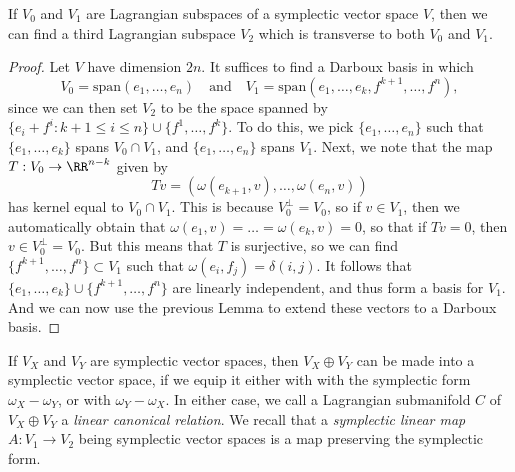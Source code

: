\begin{lemma}
    If $V_0$ and $V_1$ are Lagrangian subspaces of a symplectic vector space $V$, then we can find a third Lagrangian subspace $V_2$ which is transverse to both $V_0$ and $V_1$.
\end{lemma}
\begin{proof}
    Let $V$ have dimension $2n$. It suffices to find a Darboux basis in which
    \[ V_0 = \text{span}(e_1,\dots,e_n) \quad\text{and}\quad V_1 = \text{span}(e_1,\dots,e_k,f^{k+1},\dots,f^n), \]
    since we can then set $V_2$ to be the space spanned by $\{ e_i + f^i : k+1 \leq i \leq n \} \cup \{ f^1, \dots, f^k \}$. To do this, we pick $\{  e_1, \dots, e_n \}$ such that $\{ e_1, \dots, e_k \}$ spans $V_0 \cap V_1$, and $\{ e_1,\dots, e_n \}$ spans $V_1$. Next, we note that the map $T: V_0 \to \RR^{n-k}$ given by
    \[ Tv = (\omega(e_{k+1},v), \dots, \omega(e_n,v)) \]
    has kernel equal to $V_0 \cap V_1$. This is because $V_0^\perp = V_0$, so if $v \in V_1$, then we automatically obtain that $\omega(e_1,v) = \dots = \omega(e_k,v) = 0$, so that if $Tv = 0$, then $v \in V_0^\perp = V_0$. But this means that $T$ is surjective, so we can find $\{ f^{k+1},\dots,f^n \} \subset V_1$ such that $\omega(e_i,f_j) = \delta(i,j)$. It follows that $\{ e_1,\dots,e_k \} \cup \{ f^{k+1},\dots,f^n \}$ are linearly independent, and thus form a basis for $V_1$. And we can now use the previous Lemma to extend these vectors to a Darboux basis.
\end{proof}

If $V_X$ and $V_Y$ are symplectic vector spaces, then $V_X \oplus V_Y$ can be made into a symplectic vector space, if we equip it either with with the symplectic form $\omega_X - \omega_Y$, or with $\omega_Y - \omega_X$. In either case, we call a Lagrangian submanifold $C$ of $V_X \oplus V_Y$ a \emph{linear canonical relation}. We recall that a \emph{symplectic linear map} $A: V_1 \to V_2$ being symplectic vector spaces is a map preserving the symplectic form.


